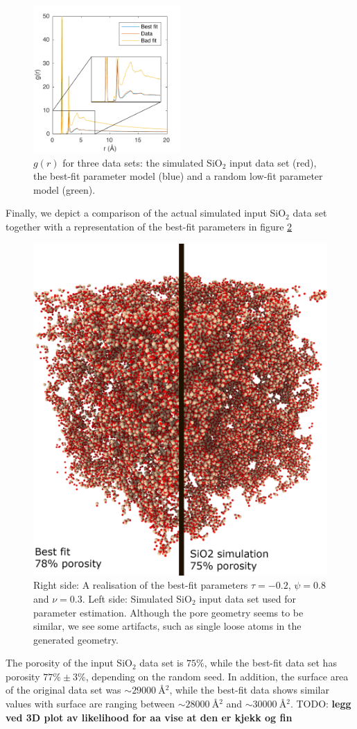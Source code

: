 \documentclass[aps,pre,twocolumn,letterpaper,floatfix,showpacs]{revtex4}
\newcommand{\todo}[1]{ {\color{Magenta} TODO: \color{Blue} \textbf{#1} }}
\begin{document}
\begin{figure}
\includegraphics[width=0.5\textwidth]{gofr_figure.pdf}
\caption{$g(r)$ for three data sets: the simulated SiO$_2$ input data set (red), the best-fit parameter model (blue) and a random low-fit parameter model (green).}
\label{fig:gofr1}
\end{figure}
Finally, we depict a comparison of the actual simulated input SiO$_2$ data set together with a representation of the best-fit parameters in figure \ref{fig:porous_vs_model}   
\begin{figure}
\includegraphics[width=.45\textwidth]{comparison.png}
\caption{Right side: A realisation of the best-fit parameters $\tau=-0.2$, $\psi=0.8$ and $\nu=0.3$. Left side: Simulated SiO$_2$ input data set used for parameter estimation. Although the pore geometry seems to be similar, we see some artifacts, such as single loose atoms in the generated geometry.}
\label{fig:porous_vs_model}
\end{figure}

The porosity of the input SiO$_2$ data set is $75\%$, while the best-fit data set has porosity $77\% \pm 3 \%$, depending on the random seed. In addition, the surface area of the original data set was $\sim \SI{29000}{\angstrom^2}$, while the best-fit data shows similar values with surface are ranging between $\sim \SI{28000}{\angstrom^2}$ and $\sim \SI{30000}{\angstrom^2}$.
\todo{legg ved 3D plot av likelihood for aa vise at den er kjekk og fin}
\end{document}
